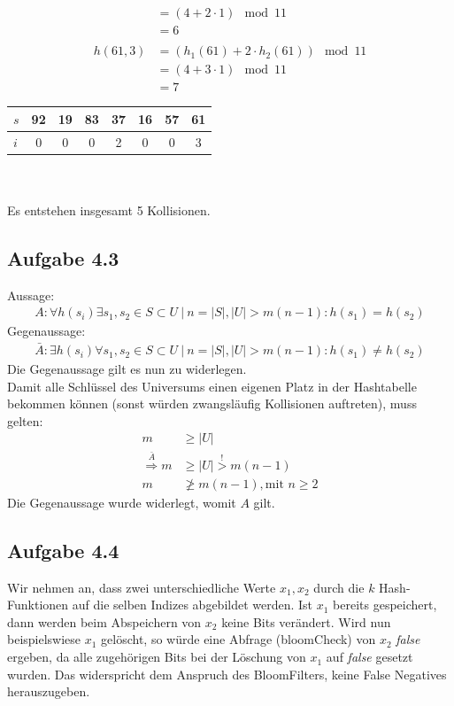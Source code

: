 \documentclass{article}
\begin{document}
\begin{enumerate}
\begin{minipage}[t]{0.4\textwidth}
\begin{align*}
                &= (4 + 2\cdot 1) \mod{11} \\
                &= 6 \\\\
                h(61, 3) &= (h_1(61) + 2\cdot h_2(61)) \mod{11} \\
                &= (4 + 3\cdot 1) \mod{11} \\
                &= 7
            \end{align*} 
            \begin{tabular}{l|ccccccc}
                $s$ & 92 & 19 & 83 & 37 & 16 & 57 & 61 \\ \hline
                $i$ & 0 & 0 & 0 & 2 & 0 & 0 & 3
            \end{tabular} \\\\
            Es entstehen insgesamt 5 Kollisionen. 
        \end{minipage}
    \end{enumerate}


    \subsection*{Aufgabe 4.3}
    Aussage:
    \begin{align*}
        A: \forall h(s_i) \exists s_1, s_2 \in S \subset U \:|\: n = |S|, |U| > m(n-1) : h(s_1) = h(s_2)
    \end{align*}
    Gegenaussage:
    \begin{align*}
        \bar{A}: \exists h(s_i) \forall s_1, s_2 \in S \subset U \:|\: n = |S|, |U| > m(n-1) : h(s_1) \neq h(s_2)
    \end{align*}
    Die Gegenaussage gilt es nun zu widerlegen. \\
    Damit alle Schlüssel des Universums einen eigenen Platz in der Hashtabelle bekommen können (sonst würden zwangsläufig Kollisionen auftreten),
    muss gelten: 
    \begin{align*}
        m &\ge |U| \\
        \stackrel{\bar{A}}{\Rightarrow} m &\ge |U| \stackrel{!}{>} m(n-1) \\
        m &\ngeq m(n-1), \text{mit } n \ge 2
    \end{align*}
    Die Gegenaussage wurde widerlegt, womit $A$ gilt. 


    \subsection*{Aufgabe 4.4}
    Wir nehmen an, dass zwei unterschiedliche Werte $x_1, x_2$ durch die $k$ Hash-Funktionen auf die selben Indizes abgebildet werden. Ist $x_1$ bereits gespeichert, dann werden beim Abspeichern von $x_2$ keine Bits verändert. Wird nun beispielswiese $x_1$ gelöscht, so würde eine Abfrage (bloomCheck) von $x_2$ \textit{false} ergeben, da alle zugehörigen Bits bei der Löschung von $x_1$ auf \textit{false} gesetzt wurden. Das widerspricht dem Anspruch des BloomFilters, keine False Negatives herauszugeben. 
\end{document}
